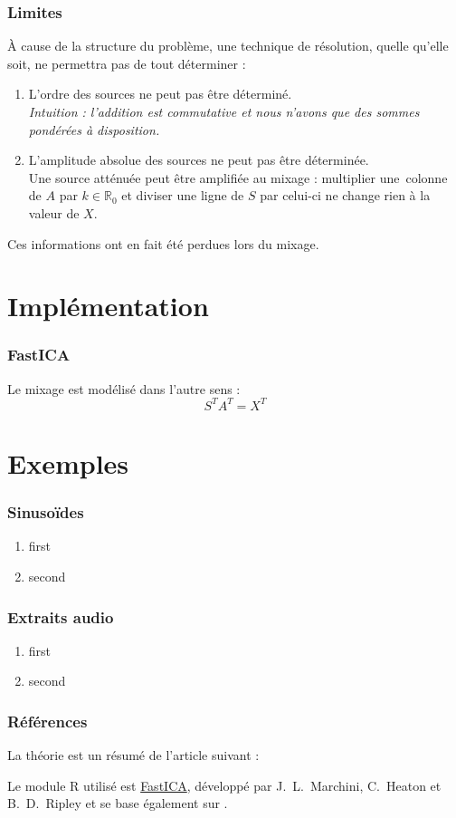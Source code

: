 \documentclass[compress]{beamer}
\newcommand{\esR}{\mathbb{R}}
\begin{document}
\begin{frame}
	\frametitle{Limites}
	À cause de la structure du problème, une technique de résolution,
	quelle qu'elle soit, ne permettra pas de tout déterminer :
	\pause
	\begin{enumerate}
	\item L'ordre des sources ne peut pas être déterminé.
	\pause
		\\\textit{Intuition : l'addition est commutative et nous n'avons que
			des sommes pondérées à disposition.}
	\pause
	\item L'amplitude absolue des sources ne peut pas être déterminée.
	\pause
		\\Une source atténuée peut être amplifiée au mixage :
			multiplier une~colonne de $A$ par $k\in\esR_0$ et
			diviser une ligne de $S$ par celui-ci ne change rien à
			la valeur de $X$.
	\pause
	\end{enumerate}

	Ces informations ont en fait été perdues lors du mixage.
\end{frame}


\section{Implémentation}
\begin{frame}
	\frametitle{FastICA}
	Le mixage est modélisé dans l'autre sens :
	\[
		S^TA^T=X^T
	\]
\end{frame}


\section{Exemples}
\begin{frame}
	\frametitle{Sinusoïdes}
	\begin{enumerate}
	\item first
	\item second
	\end{enumerate}
\end{frame}


\begin{frame}
	\frametitle{Extraits audio}
	\begin{enumerate}
	\item first
	\item second
	\end{enumerate}
\end{frame}


\appendix
\begin{frame}
	\frametitle{Références}
	La théorie est un résumé de l'article suivant :
	
	\vspace{2em}

	Le module R utilisé est
	\href{https://cran.r-project.org/web/packages/fastICA/}{FastICA},
	développé par J.~L.~Marchini, C.~Heaton et B.~D.~Ripley et
	se base également sur \cite{hyv}.
\end{frame}
\end{document}

